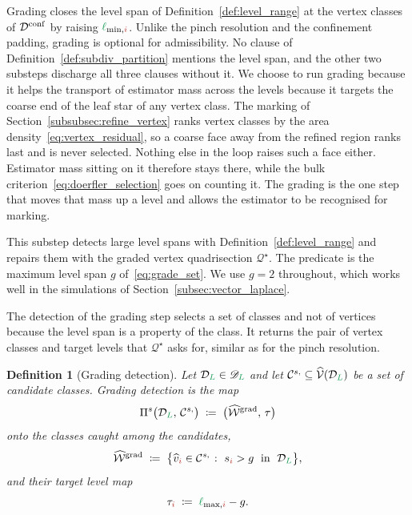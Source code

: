 \documentclass[a4paper, 12pt]{article}
\makeatletter
\newcommand{\quadriV}{\mathcal{Q}^{\star}}                       %
\newcommand{\detectG}{\Pi^{s}}                                   %
\DeclareRobustCommand{\candC}[1][]{\mathcal{C}^{s\ifx\@empty#1\@empty\else,#1\fi}}
\newcommand{\quadriVup}[1]{\quadriV_{\rightarrow #1}}            %
\newcommand{\lminIdx}[1]{\l_{\min,#1}}
\newcommand{\lmaxIdx}[1]{\l_{\max,#1}}
\newcommand{\levelSpan}[1]{s_{#1}}
\newcommand{\targetlevel}{\tau}                                 %
\newcommand{\green}{\color{ForestGreen}}
\newcommand{\brickred}{\color{BrickRed}}
\newcommand{\V}{\mathcal{V}}
\newcommand{\vertexClass}[1]{\widehat{v}_{#1}}
\newcommand{\vertexClasses}{\widehat{\V}}
\DeclareRobustCommand{\markedVertexClasses}[1][]{\widehat{\mathcal{W}}\ifx\@empty#1\@empty\else^{#1}\fi}
\newcommand{\coarseIdxone}{{\brickred i}}
\renewcommand{\l}{{\green\ell}}
\renewcommand{\L}{{\green L}}
\newtheorem{definition}[theorem]{Definition}
\theoremstyle{definition}
\theoremstyle{plain}
\numberwithin{equation}{section}
\newcommand{\tobecut}[1]{{\color{red} #1}}     %
\DeclareRobustCommand{\domseq}[1][]{\mathcal{D}\ifx\@empty#1\@empty\else_{#1}\fi}
\newcommand{\alldomseqs}{\mathscr{D}}
\makeatother
\begin{document}
Grading closes the level span of Definition~\ref{def:level_range} at the vertex classes of $\domseq^{\mathrm{conf}}$ by raising $\lminIdx{\coarseIdxone}$. Unlike the pinch resolution and the confinement padding, grading is optional for admissibility. No clause of Definition~\ref{def:subdiv_partition} mentions the level span, and the other two substeps discharge all three clauses without it. We choose to run grading because it helps the transport of estimator mass across the levels because it targets the coarse end of the leaf star of any vertex class. The marking of Section~\ref{subsubsec:refine_vertex} ranks vertex classes by the area density~\eqref{eq:vertex_residual}, so a coarse face away from the refined region ranks last and is never selected. Nothing else in the loop raises such a face either. Estimator mass sitting on it therefore stays there, while the bulk criterion~\eqref{eq:doerfler_selection} goes on counting it. The grading is the one step that moves that mass up a level and allows the estimator to be recognised for marking.

\smallskip

This substep detects large level spans with Definition~\ref{def:level_range} and repairs them with the graded vertex quadrisection $\quadriV$. The predicate is the maximum level span $g$ of~\eqref{eq:grade_set}. We use $g = 2$ throughout, which works well in the simulations of Section~\ref{subsec:vector_laplace}.

The detection of the grading step selects a set of classes and not of vertices because the level span is a property of the class. It returns the pair of vertex classes and target levels that $\quadriV$ asks for, similar as for the pinch resolution.

\begin{definition}[Grading detection]
    \label{def:grading_detection}
    Let $\domseq[\L] \in \alldomseqs_\L$ and let $\candC \subseteq \vertexClasses(\domseq[\L])$ be a set of candidate classes. \emph{Grading detection} is the map
    \begin{equation}
        \label{eq:grading_detection}
        \detectG \big( \domseq[\L], \, \candC \big) \; \coloneq \; \big( \markedVertexClasses[\mathrm{grad}], \, \targetlevel \big)
    \end{equation}
    onto the classes caught among the candidates,
    \begin{equation}
        \label{eq:grading_detection_classes}
        \markedVertexClasses[\mathrm{grad}] \; \coloneq \; \big\{ \vertexClass{\coarseIdxone} \in \candC \; \colon \; \levelSpan{\coarseIdxone} > g \; \text{ in } \; \domseq[\L] \big\},
    \end{equation}
    and their target level map
    \begin{equation}
        \label{eq:grading_detection_target}
        \targetlevel_\coarseIdxone \; \coloneq \; \lmaxIdx{\coarseIdxone} - g .
    \end{equation}
\end{definition}
\end{document}

